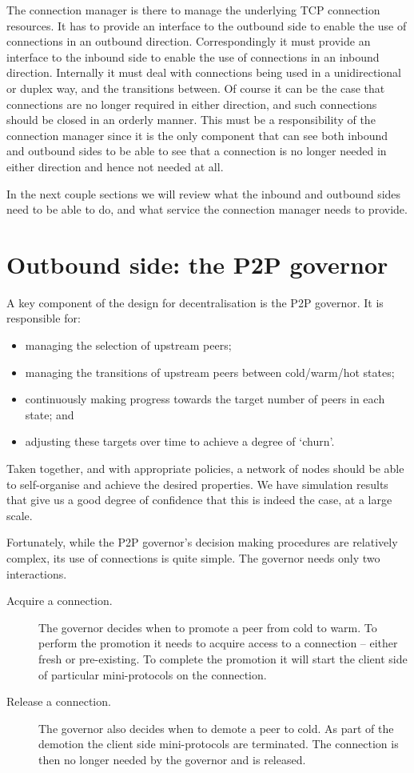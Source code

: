 The connection manager is there to manage the underlying TCP connection
resources. It has to provide an interface to the outbound side to enable the
use of connections in an outbound direction. Correspondingly it must provide an
interface to the inbound side to enable the use of connections in an inbound
direction. Internally it must deal with connections being used in a
unidirectional or duplex way, and the transitions between. Of course it
can be the case that connections are no longer required in either direction,
and such connections should be closed in an orderly manner. This must be a
responsibility of the connection manager since it is the only component that
can see both inbound and outbound sides to be able to see that a connection is
no longer needed in either direction and hence not needed at all.

In the next couple sections we will review what the inbound and outbound sides
need to be able to do, and what service the connection manager needs to provide.

\section{Outbound side: the P2P governor}

A key component of the design for decentralisation is the P2P governor. It
is responsible for:
\begin{itemize}
\item managing the selection of upstream peers;
\item managing the transitions of upstream peers between cold/warm/hot states;
\item continuously making progress towards the target number of peers in each
      state; and
\item adjusting these targets over time to achieve a degree of `churn'.
\end{itemize}
Taken together, and with appropriate policies, a network of nodes should be
able to self-organise and achieve the desired properties. We have simulation
results that give us a good degree of confidence that this is indeed the case,
at a large scale.

Fortunately, while the P2P governor's decision making procedures are relatively
complex, its use of connections is quite simple. The governor needs only two
interactions.
\begin{description}
\item[Acquire a connection.] The governor decides when to promote a peer from
  cold to warm. To perform the promotion it needs to acquire access to a
  connection -- either fresh or pre-existing. To complete the promotion it will
  start the client side of particular mini-protocols on the connection.

\item[Release a connection.] The governor also decides when to demote a peer to
  cold. As part of the demotion the client side mini-protocols are terminated.
  The connection is then no longer needed by the governor and is released.
\end{description}

